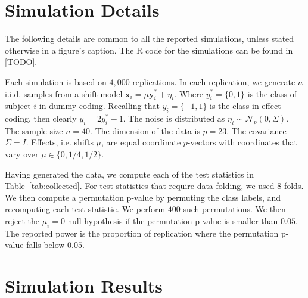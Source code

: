 \documentclass[12pt,a4paper]{article}
\theoremstyle{definition}
\newcommand{\set}[1]{\{ #1 \}} %
\newcommand{\rv}[1]{\mathbf{#1}} %
\newcommand{\x}{\rv x} %
\newcommand{\y}{\rv y} %
\newcommand{\gaussp}[2]{\mathcal{N}_{#1}\left(#2\right)} %
\newcommand{\R}{\textsf{R }}
\begin{document}
\newpage


\section{Simulation Details}
\label{apx:simulation_details}

The following details are common to all the reported simulations, unless stated otherwise in a figure's caption. 
The \R code for the simulations can be found in [TODO].

Each simulation is based on $4,000$ replications. 
In each replication, we generate $n$ i.i.d. samples from a shift model $\x_i = \mu \y^*_i + \eta_i$.
Where $y^*_i=\set{0,1}$ is the class of subject $i$ in dummy coding. 
Recalling that $y_i=\set{-1,1}$ is the class in effect coding, then clearly $y_i=2 y^*_i-1$.
The noise is distributed as $\eta_i \sim \gaussp{p}{0,\Sigma}$. 
The sample size $n=40$. 
The dimension of the data is $p=23$. 
The covariance $\Sigma=I$. 
Effects, i.e. shifts $\mu$, are equal coordinate $p$-vectors with coordinates that vary over $\mu \in \set{0,1/4,1/2}$.

Having generated the data, we compute each of the test statistics in Table~\ref{tab:collected}.
For test statistics that require data folding, we used $8$ folds. 
We then compute a permutation p-value by permuting the class labels, and recomputing each test statistic. 
We perform $400$ such permutations. 
We then reject the $\mu_i=0$ null hypothesis if the permutation p-value is smaller than $0.05$.
The reported power is the proportion of replication where the permutation p-value falls below $0.05$.




\newpage

\section{Simulation Results}
\label{apx:simulations}
\end{document}
